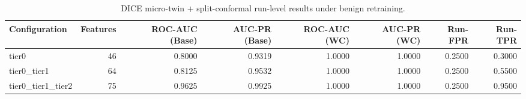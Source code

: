\begin{table}[t]
\centering
\caption{DICE micro-twin + split-conformal run-level results under benign retraining.}
\label{tab:dice_full_overall}
\footnotesize
\begin{tabular}{lrrrrrrr}
\toprule
Configuration & Features & ROC-AUC (Base) & AUC-PR (Base) & ROC-AUC (WC) & AUC-PR (WC) & Run-FPR & Run-TPR \\
\midrule
tier0 & 46 & 0.8000 & 0.9319 & 1.0000 & 1.0000 & 0.2500 & 0.3000 \\
tier0_tier1 & 64 & 0.8125 & 0.9532 & 1.0000 & 1.0000 & 0.2500 & 0.5500 \\
tier0_tier1_tier2 & 75 & 0.9625 & 0.9925 & 1.0000 & 1.0000 & 0.2500 & 0.9500 \\
\bottomrule
\end{tabular}

\end{table}
